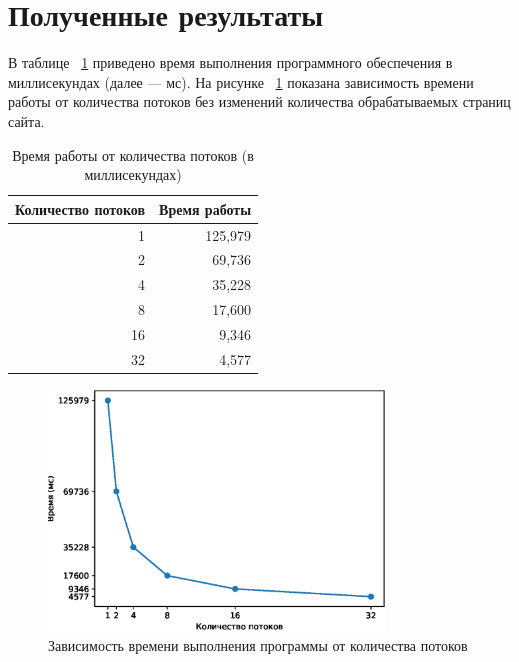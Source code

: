 \section{Полученные результаты}

В таблице ~\ref{tbl:time_measurements1} приведено время выполнения
программного обеспечения в миллисекундах (далее --- мс). На рисунке
~\ref{fig:image1} показана зависимость времени работы от количества
потоков без изменений количества обрабатываемых страниц сайта.

\begin{table}[h]
	\begin{center}
		\begin{threeparttable}
		\captionsetup{justification=raggedright,singlelinecheck=off}
		\caption{Время работы от количества потоков (в миллисекундах)}
		\label{tbl:time_measurements1}
                    \begin{tabular}{|r|r|}
                        \hline
                        Количество потоков & Время работы\\
                        \hline
                        1 & 125,979 \\
                         \hline
                        2 & 69,736 \\
                         \hline
                        4 & 35,228 \\
                         \hline
                        8 & 17,600 \\
                         \hline
                        16 & 9,346 \\
                         \hline
                        32 & 4,577 \\
                         \hline
                    \end{tabular}
		\end{threeparttable}
    \end{center}
\end{table}

\begin{figure}[h!]
    \centering
    \includegraphics[width=0.8\textwidth]{img/Figure_1.eps}
    \caption{Зависимость времени выполнения программы от количества потоков}
    \label{fig:image1}
\end{figure}

